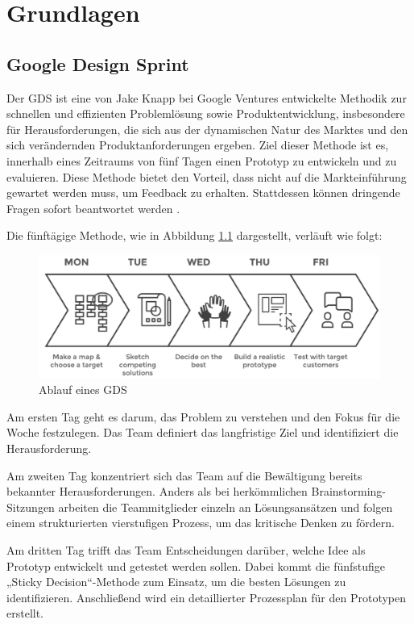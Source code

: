 \chapter{Grundlagen}

\section{Google Design Sprint}

Der \ac{GDS} ist eine von Jake Knapp bei Google Ventures entwickelte Methodik zur schnellen und effizienten Problemlösung sowie Produktentwicklung, insbesondere für Herausforderungen, die sich aus der dynamischen Natur des Marktes und den sich verändernden Produktanforderungen ergeben. 
Ziel dieser Methode ist es, innerhalb eines Zeitraums von fünf Tagen einen Prototyp zu entwickeln und zu evaluieren. 
Diese Methode bietet den Vorteil, dass nicht auf die Markteinführung gewartet werden muss, um Feedback zu erhalten. Stattdessen können dringende Fragen sofort beantwortet werden \cite[S.98 f.]{Design_Sprint}.

Die fünftägige Methode, wie in Abbildung \ref{GDS} dargestellt, verläuft wie folgt:

\begin{figure}[h]
    \centering
    \includegraphics[clip,width=0.75\linewidth]{images/GDS.png}
    \caption[Ablauf eines GDS]{Ablauf eines GDS \cite{GDS_Abbildung}}
    \label{GDS}
\end{figure}

Am ersten Tag geht es darum, das Problem zu verstehen und den Fokus für die Woche festzulegen. Das Team definiert das langfristige Ziel und identifiziert die Herausforderung. 

Am zweiten Tag konzentriert sich das Team auf die Bewältigung bereits bekannter Herausforderungen. Anders als bei herkömmlichen Brainstorming-Sitzungen arbeiten die Teammitglieder einzeln an Lösungsansätzen und folgen einem strukturierten vierstufigen Prozess, um das kritische Denken zu fördern. 

Am dritten Tag trifft das Team Entscheidungen darüber, welche Idee als Prototyp entwickelt und getestet werden sollen. Dabei kommt die fünfstufige „Sticky Decision“-Methode zum Einsatz, um die besten Lösungen zu identifizieren. Anschließend wird ein detaillierter Prozessplan für den Prototypen erstellt. 

